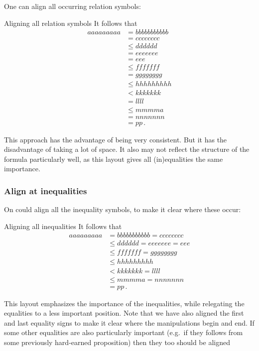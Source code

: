 One can align all occurring relation symbols:
\begin{showlatex}{Aligning all relation symbols}
It follows that
\begin{align*}
  aaaaaaaaa
  &= bbbbbbbbbbb \\
  &= cccccccc \\
  &\leq dddddd \\
  &= eeeeeee \\
  &= eee \\
  &\leq fffffff \\
  &= gggggggg \\
  &\leq hhhhhhhhh \\
  &< kkkkkkk \\
  &= llll \\
  &\leq mmmma \\
  &= nnnnnnn \\
  &= pp \,.
\end{align*}
\end{showlatex}
This approach has the advantage of being very consistent.
But it has the disadvantage of taking a lot of space.
It also may not reflect the structure of the formula particularly well, as this layout gives all (in)equalities the same importance.
    
\subsubsection{Align at inequalities}

On could align all the inequality symbols, to make it clear where these occur:
\begin{showlatex}{Aligning all inequalities}
It follows that
\begin{align*}
  aaaaaaaaa
  &= bbbbbbbbbbb
  = cccccccc
  \\
  &\leq
  dddddd
  = eeeeeee
  = eee
  \\
  &\leq
  fffffff
  = gggggggg
  \\
  &\leq
  hhhhhhhhh
  \\
  &<
  kkkkkkk
  = llll \\
  &\leq mmmma
  = nnnnnnn
  \\
  &= pp \,.
\end{align*}
\end{showlatex}
This layout emphasizes the importance of the inequalities, while relegating the equalities to a less important position.
Note that we have also aligned the first and last equality signs to make it clear where the manipulations begin and end.
If some other equalities are also particularly important (e.g.\ if they follows from some previously hard-earned proposition) then they too should be aligned


